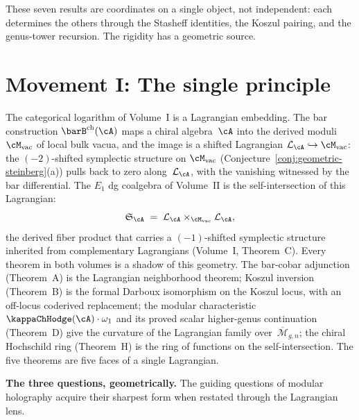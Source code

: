 
\bigskip

These seven results are coordinates on a single object,
not independent: each determines the others
through the Stasheff identities, the Koszul pairing, and the
genus-tower recursion. The rigidity has a geometric source.

\section*{Movement I\@: The single principle}

\providecommand{\cL}{\mathcal{L}}
\providecommand{\Mvac}{\cM_{\mathrm{vac}}}
\providecommand{\Mbar}{\overline{\mathcal M}}

The categorical logarithm of Volume~I is a Lagrangian embedding.
The bar construction $\barB^{\mathrm{ch}}(\cA)$ maps a chiral
algebra~$\cA$ into the derived moduli~$\Mvac$ of local bulk vacua,
and the image is a shifted Lagrangian
$\cL_\cA \hookrightarrow \Mvac$: the $(-2)$-shifted symplectic
structure on $\Mvac$
(Conjecture~\ref{conj:geometric-steinberg}(a)) pulls back to zero
along~$\cL_\cA$, with the vanishing witnessed by the bar
differential. The $E_1$ dg coalgebra of Volume~II is the
self-intersection of this Lagrangian:
\[
 \mathfrak{S}_\cA
 \;=\;
 \cL_\cA \times_{\Mvac} \cL_\cA,
\]
the derived fiber product that carries a $(-1)$-shifted symplectic
structure inherited from complementary Lagrangians
(Volume~I, Theorem~C). Every theorem in both volumes is a shadow of
this geometry. The bar-cobar adjunction (Theorem~A) is the
Lagrangian neighborhood theorem; Koszul inversion (Theorem~B) is the
formal Darboux isomorphism on the Koszul locus, with an off-locus
coderived replacement; the modular characteristic
$\kappaChHodge(\cA) \cdot \omega_1$ and its proved scalar higher-genus
continuation (Theorem~D) give the curvature of the Lagrangian family
over~$\Mbar_{g,n}$; the chiral
Hochschild ring (Theorem~H) is the ring of functions on the
self-intersection. The five theorems are five faces of a single
Lagrangian.

\medskip

\noindent\textbf{The three questions, geometrically.}\enspace
The guiding questions of modular holography
acquire their sharpest form when restated through the Lagrangian lens.

